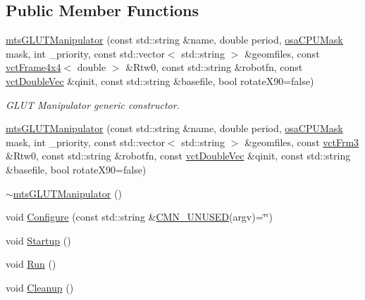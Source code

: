 \subsection*{Public Member Functions}
\begin{DoxyCompactItemize}
\item 
\hyperlink{classmts_g_l_u_t_manipulator_a1e7811133de2349f3dde7e3fd3960ef2}{mts\-G\-L\-U\-T\-Manipulator} (const std\-::string \&name, double period, \hyperlink{osa_c_p_u_affinity_8h_aaec7cdd7797e5e6eb5438c15fee5477a}{osa\-C\-P\-U\-Mask} mask, int \-\_\-priority, const std\-::vector$<$ std\-::string $>$ \&geomfiles, const \hyperlink{classvct_frame4x4}{vct\-Frame4x4}$<$ double $>$ \&Rtw0, const std\-::string \&robotfn, const \hyperlink{vct_dynamic_vector_types_8h_ade4b3068c86fb88f41af2e5187e491c2}{vct\-Double\-Vec} \&qinit, const std\-::string \&basefile, bool rotate\-X90=false)
\begin{DoxyCompactList}\small\item\em G\-L\-U\-T Manipulator generic constructor. \end{DoxyCompactList}\item 
\hyperlink{classmts_g_l_u_t_manipulator_aff586ecc21c6190eca6e6bd30feb68b6}{mts\-G\-L\-U\-T\-Manipulator} (const std\-::string \&name, double period, \hyperlink{osa_c_p_u_affinity_8h_aaec7cdd7797e5e6eb5438c15fee5477a}{osa\-C\-P\-U\-Mask} mask, int \-\_\-priority, const std\-::vector$<$ std\-::string $>$ \&geomfiles, const \hyperlink{vct_transformation_types_8h_a81feda0a02c2d1bc26e5553f409fed20}{vct\-Frm3} \&Rtw0, const std\-::string \&robotfn, const \hyperlink{vct_dynamic_vector_types_8h_ade4b3068c86fb88f41af2e5187e491c2}{vct\-Double\-Vec} \&qinit, const std\-::string \&basefile, bool rotate\-X90=false)
\item 
\hyperlink{classmts_g_l_u_t_manipulator_aa368d4711cf2993663bc1d605f07d2a1}{$\sim$mts\-G\-L\-U\-T\-Manipulator} ()
\item 
void \hyperlink{classmts_g_l_u_t_manipulator_a7d4223551917fc3a2aa8a8ae1c364246}{Configure} (const std\-::string \&\hyperlink{cmn_portability_8h_a021894e2626935fa2305434b1e893ff6}{C\-M\-N\-\_\-\-U\-N\-U\-S\-E\-D}(argv)=\char`\"{}\char`\"{})
\item 
void \hyperlink{classmts_g_l_u_t_manipulator_a8ac4e40198ddb4afdafb06e354285303}{Startup} ()
\item 
void \hyperlink{classmts_g_l_u_t_manipulator_a1a8729d2fe65bc4934ea7a99752d8b1f}{Run} ()
\item 
void \hyperlink{classmts_g_l_u_t_manipulator_a3913f7c2b08369f300bc9c6e646f1df0}{Cleanup} ()
\end{DoxyCompactItemize}
